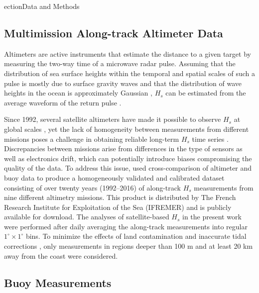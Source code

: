 ection{Data and Methods}

\subsection{Multimission Along-track Altimeter Data}

Altimeters are active instruments that estimate the distance to a given target by measuring the two-way time of a microwave radar pulse. 
Assuming that the distribution of sea surface heights within the temporal and spatial scales of such a pulse is mostly due to surface gravity waves and that the distribution of wave heights in the ocean is approximately Gaussian \citep{pierson1955wind,longuet1963effect}, $H_s$ can be estimated from the average waveform of the return pulse \citep{brown1977average}. 


Since 1992, several satellite altimeters have made it possible to observe $H_s$ at global scales \citep{young2011global}, yet the lack of homogeneity between measurements from different missions poses a challenge in obtaining reliable long-term $H_s$ time series \citep{queffeulou2004long,zieger2009joint}. 
Discrepancies between missions arise from differences in the type of sensors as well as electronics drift, which can potentially introduce biases compromising the quality of the data. 
To address this issue, \citet{queffeulou2004long} used cross-comparison of altimeter and buoy data to produce a homogeneously validated and calibrated dataset consisting of over twenty years (1992--2016) of along-track $H_s$ measurements from nine different altimetry missions.
This product is distributed by The French Research Institute for Exploitation of the Sea (IFREMER) 
and is publicly available for download.
The analyses of satellite-based $H_s$ in the present work were performed after daily averaging the along-track measurements into regular $1^\circ\times 1^\circ$ bins. 
To minimize the effects of land contamination and inaccurate tidal corrections \citep{bouffard2008exploiting}, only measurements in regions deeper than 100 m and at least 20 km away from the coast were considered.

\subsection{Buoy Measurements}\label{buoy_methods}

